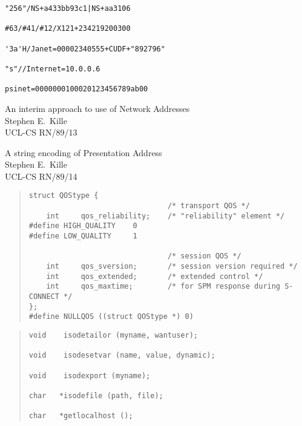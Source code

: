 \begin{bwslide}

\begin{verbatim}
"256"/NS+a433bb93c1|NS+aa3106

#63/#41/#12/X121+234219200300

'3a'H/Janet=00002340555+CUDF+"892796"

"s"//Internet=10.0.0.6

psinet=0000000100020123456789ab00
\end{verbatim}
\end{bwslide}


\begin{bwslide}

\begin{nrtc}
\item	An interim approach to use of Network Addresses\\
	Stephen E.~Kille\\
	UCL-CS RN/89/13

\item	A string encoding of Presentation Address\\
	Stephen E.~Kille\\
	UCL-CS RN/89/14
\end{nrtc}
\end{bwslide}


\begin{bwslide}

\begin{quote}\small\begin{verbatim}
struct QOStype {
                                /* transport QOS */
    int     qos_reliability;    /* "reliability" element */
#define HIGH_QUALITY    0
#define LOW_QUALITY     1

                                /* session QOS */
    int     qos_sversion;       /* session version required */
    int     qos_extended;       /* extended control */
    int     qos_maxtime;        /* for SPM response during S-CONNECT */
};
#define NULLQOS ((struct QOStype *) 0)
\end{verbatim}\end{quote}
\end{bwslide}


\begin{bwslide}

\begin{quote}\small\begin{verbatim}
void    isodetailor (myname, wantuser);

void    isodesetvar (name, value, dynamic);

void    isodexport (myname);

char   *isodefile (path, file);

char   *getlocalhost ();
\end{verbatim}\end{quote}
\end{bwslide}



